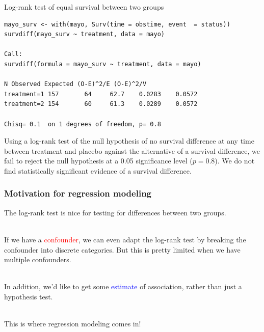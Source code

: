 \documentclass[10pt,t]{beamer}
\begin{document}
\begin{frame}[fragile]{Log-rank test of equal survival between two groups }
\vspace{-5 mm}


\small
\begin{verbatim}
mayo_surv <- with(mayo, Surv(time = obstime, event  = status))
survdiff(mayo_surv ~ treatment, data = mayo)

Call:
survdiff(formula = mayo_surv ~ treatment, data = mayo)

N Observed Expected (O-E)^2/E (O-E)^2/V
treatment=1 157       64     62.7    0.0283    0.0572
treatment=2 154       60     61.3    0.0289    0.0572

Chisq= 0.1  on 1 degrees of freedom, p= 0.8 
\end{verbatim}

\normalsize

Using a log-rank test of the null hypothesis of no survival difference at any time between treatment and placebo against the alternative of a survival difference, we fail to reject the null hypothesis at a 0.05 significance level ($p = 0.8$). We do not find statistically significant evidence of a survival difference. 

\end{frame}

\begin{frame}[fragile]
\frametitle{Motivation for regression modeling}
The log-rank test is nice for testing for differences between two groups. 
\\ ~\ 

If we have a \textcolor{red}{confounder}, we can even adapt the log-rank test by breaking the confounder into discrete categories. But this is pretty limited when we have multiple confounders. 
\\ ~\

In addition, we'd like to get some \textcolor{blue}{estimate} of association, rather than just a hypothesis test. 
\\ ~\ 

This is where regression modeling comes in!
\end{frame}
\end{document}
